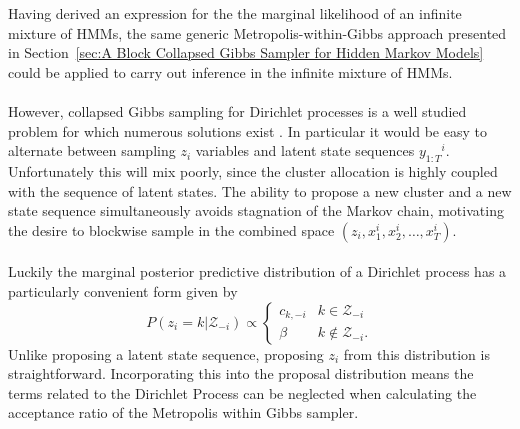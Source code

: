 \documentclass[12pt]{report}
\newcommand{\1}[0]{\mathbbm{1}}
\newcommand{\seq}[3]{\ensuremath{#1_{{#2}:{#3}}}}
\begin{document}
Having derived an expression for the the marginal likelihood of an infinite
mixture of \acp{HMM}, the same generic Metropolis-within-Gibbs approach presented
in Section~\ref{sec:A Block Collapsed Gibbs Sampler for Hidden Markov Models}
could be applied to carry out inference in the infinite mixture of \acp{HMM}.
\\\\
However, collapsed Gibbs sampling for Dirichlet processes is a well studied problem for
which numerous solutions exist \cite{neal-mcmc-dp}. In particular it would be easy
to alternate between sampling $z_i$ variables and latent state sequences $\seq{y}{1}{T}^i$.
Unfortunately this will mix poorly, since the cluster allocation is highly coupled with
the sequence of latent states. The ability to propose a new cluster and a new state sequence
simultaneously avoids stagnation of the Markov chain, motivating the desire to blockwise sample
in the combined space $(z_i, x^i_1, x^i_2, \ldots, x^i_T)$.
\\\\
Luckily the marginal posterior predictive distribution of a Dirichlet process has a particularly
convenient form \cite{infinite-gmm} given by
\[
    P(z_i=k|\mathcal{Z}_{-i}) \propto
    \begin{cases}
        c_{k,-i} & k \in \mathcal{Z}_{-i} \\
        \beta   & k \not\in \mathcal{Z}_{-i}.
    \end{cases}
\]
Unlike proposing a latent state sequence, proposing $z_i$ from this distribution is straightforward.
Incorporating this into the proposal distribution means the terms related to the Dirichlet Process
can be neglected when calculating the acceptance ratio of the Metropolis within Gibbs sampler.
\end{document}
